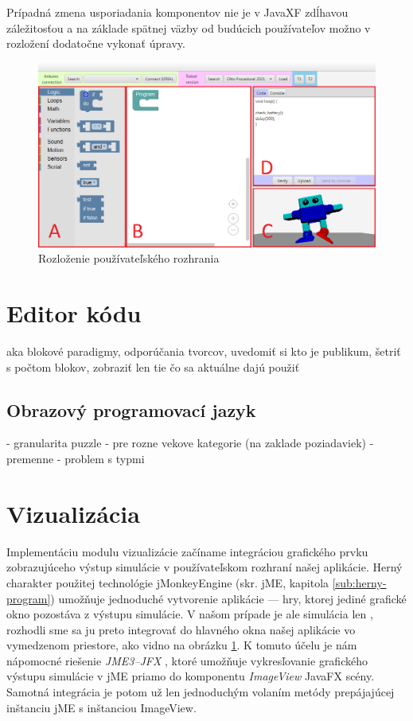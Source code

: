 Prípadná zmena usporiadania komponentov nie je v JavaXF zdĺhavou záležitosťou a na základe spätnej väzby od budúcich používateľov možno v rozložení dodatočne vykonať úpravy.

\begin{figure}
\centerline{\includegraphics[width=1\textwidth]{images/rozlozenie-gui}}
\caption[Rozloženie používateľského rozhrania]{Rozloženie používateľského rozhrania}
\label{obr:gui-layout}
\end{figure}


\section{Editor kódu}
aka blokové paradigmy, odporúčania tvorcov, uvedomiť si kto je publikum, šetriť s počtom blokov, zobraziť len tie čo sa aktuálne dajú použiť

\subsection{Obrazový programovací jazyk}
- granularita puzzle
- pre rozne vekove kategorie (na zaklade poziadaviek)
- premenne - problem s typmi


\section{Vizualizácia}
Implementáciu modulu vizualizácie začíname integráciou grafického prvku zobrazujúceho výstup simulácie v používateľskom rozhraní našej aplikácie. Herný charakter použitej technológie jMonkeyEngine (skr. jME, kapitola \ref{sub:herny-program}) umožňuje jednoduché vytvorenie aplikácie --- hry, ktorej jediné grafické okno pozostáva z výstupu simulácie. V našom prípade je ale simulácia len , rozhodli sme sa ju preto integrovať do hlavného okna našej aplikácie vo vymedzenom priestore, ako vidno na obrázku \ref{obr:gui-layout}. K tomuto účelu je nám nápomocné riešenie \textit{JME3--JFX} \cite{jmejfx}, ktoré umožňuje vykresľovanie grafického výstupu simulácie v jME priamo do komponentu \textit{ImageView} JavaFX scény. Samotná integrácia je potom už len jednoduchým volaním metódy prepájajúcej inštanciu jME s inštanciou ImageView.

